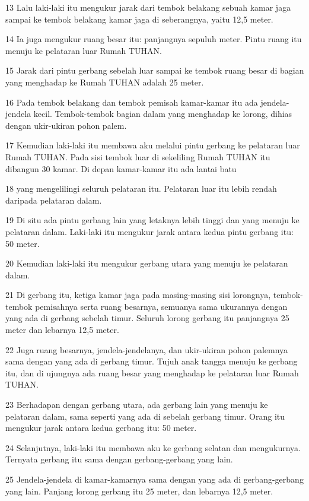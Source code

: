 \par 13 Lalu laki-laki itu mengukur jarak dari tembok belakang sebuah kamar jaga sampai ke tembok belakang kamar jaga di seberangnya, yaitu 12,5 meter.
\par 14 Ia juga mengukur ruang besar itu: panjangnya sepuluh meter. Pintu ruang itu menuju ke pelataran luar Rumah TUHAN.
\par 15 Jarak dari pintu gerbang sebelah luar sampai ke tembok ruang besar di bagian yang menghadap ke Rumah TUHAN adalah 25 meter.
\par 16 Pada tembok belakang dan tembok pemisah kamar-kamar itu ada jendela-jendela kecil. Tembok-tembok bagian dalam yang menghadap ke lorong, dihias dengan ukir-ukiran pohon palem.
\par 17 Kemudian laki-laki itu membawa aku melalui pintu gerbang ke pelataran luar Rumah TUHAN. Pada sisi tembok luar di sekeliling Rumah TUHAN itu dibangun 30 kamar. Di depan kamar-kamar itu ada lantai batu
\par 18 yang mengelilingi seluruh pelataran itu. Pelataran luar itu lebih rendah daripada pelataran dalam.
\par 19 Di situ ada pintu gerbang lain yang letaknya lebih tinggi dan yang menuju ke pelataran dalam. Laki-laki itu mengukur jarak antara kedua pintu gerbang itu: 50 meter.
\par 20 Kemudian laki-laki itu mengukur gerbang utara yang menuju ke pelataran dalam.
\par 21 Di gerbang itu, ketiga kamar jaga pada masing-masing sisi lorongnya, tembok-tembok pemisahnya serta ruang besarnya, semuanya sama ukurannya dengan yang ada di gerbang sebelah timur. Seluruh lorong gerbang itu panjangnya 25 meter dan lebarnya 12,5 meter.
\par 22 Juga ruang besarnya, jendela-jendelanya, dan ukir-ukiran pohon palemnya sama dengan yang ada di gerbang timur. Tujuh anak tangga menuju ke gerbang itu, dan di ujungnya ada ruang besar yang menghadap ke pelataran luar Rumah TUHAN.
\par 23 Berhadapan dengan gerbang utara, ada gerbang lain yang menuju ke pelataran dalam, sama seperti yang ada di sebelah gerbang timur. Orang itu mengukur jarak antara kedua gerbang itu: 50 meter.
\par 24 Selanjutnya, laki-laki itu membawa aku ke gerbang selatan dan mengukurnya. Ternyata gerbang itu sama dengan gerbang-gerbang yang lain.
\par 25 Jendela-jendela di kamar-kamarnya sama dengan yang ada di gerbang-gerbang yang lain. Panjang lorong gerbang itu 25 meter, dan lebarnya 12,5 meter.
